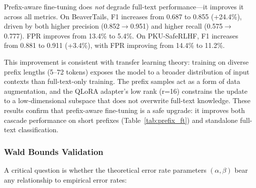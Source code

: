 \documentclass[acmtjournal, acmnowidth]{acmart}
\theoremstyle{definition}
\begin{document}
Prefix-aware fine-tuning does \textit{not} degrade full-text performance---it improves it across all metrics. On BeaverTails, F1 increases from 0.687 to 0.855 (+24.4\%), driven by both higher precision (0.852$\to$0.951) and higher recall (0.575$\to$0.777). FPR improves from 13.4\% to 5.4\%. On PKU-SafeRLHF, F1 increases from 0.881 to 0.911 (+3.4\%), with FPR improving from 14.4\% to 11.2\%.

This improvement is consistent with transfer learning theory: training on diverse prefix lengths (5--72 tokens) exposes the model to a broader distribution of input contexts than full-text-only training. The prefix samples act as a form of data augmentation, and the QLoRA adapter's low rank (r=16) constrains the update to a low-dimensional subspace that does not overwrite full-text knowledge. These results confirm that prefix-aware fine-tuning is a safe upgrade: it improves both cascade performance on short prefixes (Table~\ref{tab:prefix_ft}) and standalone full-text classification.

\subsubsection{Wald Bounds Validation}
\label{sec:wald_validation}

A critical question is whether the theoretical error rate parameters $(\alpha, \beta)$ bear any relationship to empirical error rates:
\end{document}
